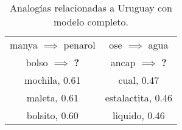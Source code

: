 \begin{table*}[ht]
    \centering
    \begin{tabular}{|c|c|}
        \hline
        manya $\implies$ penarol & ose $\implies$ agua\\
        bolso $\implies$ \textbf{?} & ancap $\implies$ \textbf{?}\\
        \hline
        mochila, 0.61 & cual, 0.47\\
        maleta, 0.61 & estalactita, 0.46\\
        bolsito, 0.60 & liquido, 0.46\\
        \hline
    \end{tabular}
    \caption{Analogías relacionadas a Uruguay con modelo completo.}
    \label{table:analogies_uruguay_3}
\end{table*}
